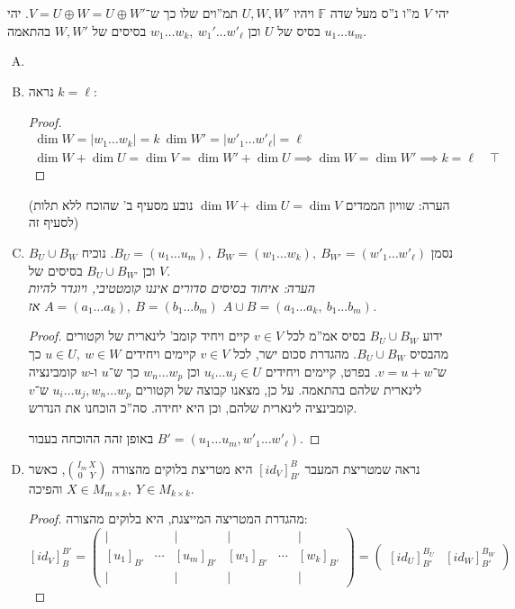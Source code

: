 \documentclass[]{article}
\newcommand\ml    {\ell}
\newcommand\F         {\mathbb{F}}
\newcommand\pms[1]    {\begin{pmatrix}
        #1
\end{pmatrix}}
\newcommand\sof[1]    {\left | #1 \right |}
\theoremstyle{definition}
\begin{document}
    \section{}
    יהי $V$ מ''ו נ''ס מעל שדה $\F$ ויהיו $U, W, W'$ תמ''וים שלו כך ש־$V = U \oplus W = U \oplus W'$. יהי $u_1 \dots u_m$ בסיס של $U$ וכן
     $w_1 \dots w_k, \ w_1' \dots w'_\ml$ בסיסים של $W, W'$ בהתאמה. 
    \begin{enumerate}[A)]
        \item \item נראה $k = \ml$: 
        \begin{proof}
            \begin{gather*}
                \dim W = \sof{w_1 \dots w_k} = k \ \dim W' = \sof{w'_1 \dots w'_\ml} = \ml \\
                \dim W + \dim U = \dim V = \dim W' + \dim U \implies \dim W = \dim W' \implies k = \ml \quad \top
            \end{gather*}
        \end{proof}
        (הערה: שוויון הממדים $\dim W + \dim U = \dim V$ נובע מסעיף ב' שהוכח ללא תלות לסעיף זה)
        \item נסמן $B_U = (u_1 \dots u_m), \ B_W = (w_1 \dots w_k), \ B_{W'} = (w'_1 \dots w'_\ml)$. נוכיח $B_U \cup B_W$ וכן $B_U \cup B_{W'}$ בסיסים של $V$. \\
        \textit{הערה: איחוד בסיסים סדורים איננו קומטטיבי, ויוגדר להיות $A = (a_1 \dots a_k), \ B = (b_1 \dots b_m)$ אז $A \cup B = (a_1 \dots a_k, \ b_1 \dots b_m)$. }
        \begin{proof}
            ידוע $B_U \cup B_W$ בסיס אמ''מ לכל $v \in V$ קיים ויחיד קומב' לינארית של וקטורים מהבסיס $B_U \cup B_W$. מהגדרת סכום ישר, לכל $v \in V$ קיימים ויחידים $u \in U, \ w \in W$ כך ש־$v = u + w$. בפרט, קיימים ויחידים $u_i \dots u_j \in U$ וכן $w_n \dots w_p$ כך ש־$u$ ו-$w$ קומבינציה לינארית שלהם בהתאמה. על כן, מצאנו קבוצה של וקטורים $u_i \dots u_j, w_n \dots w_p$ ש־$v$ קומבינציה לינארית שלהם, וכן היא יחידה. סה''כ הוכחנו את הנדרש. 
            
        באופן זהה ההוכחה בעבור $B' = (u_1 \dots u_m, w'_1 \dots w'_\ml)$. 
        \end{proof}
        \item נראה שמטריצת המעבר $[id_V]^{B}_{B'}$ היא מטריצת בלוקים מהצורה $\binom{I_m \, X}{0\,\,\,\,\, Y}$, כאשר $X \in M_{m \times k}, \ Y \in M_{k \times k}$ והפיכה. \begin{proof}
            מהגדרת המטריצה המייצגת, היא בלוקים מהצורה: 
            \[ [id_V]^{B'}_{B} = \pms{\vert &  & \vert & \vert &  & \vert \\ [u_1]_{B'} & \cdots & [u_m]_{B'} & [w_1]_{B'} & \cdots & [w_k]_{B'} \\ \vert &  & \vert & \vert &  & \vert} = \pms{[id_{U}]^{B_U}_{B'} & [id_{W}]_{B'}^{B_W}} \]
            

\end{proof}
\end{enumerate}
\end{document}
